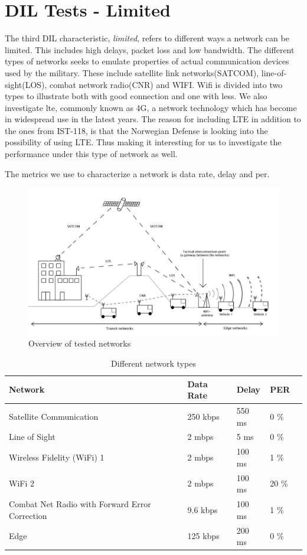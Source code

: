 \section{DIL Tests - Limited}

The third DIL characteristic, \textit{limited}, refers to different ways a network
can be limited. This includes high delays, packet loss and low bandwidth. The
different types of networks seeks to emulate properties of actual communication
devices used by the military. These include satellite link networks(SATCOM),
line-of-sight(LOS), combat network radio(CNR) and WIFI. Wifi is divided into two
types to illustrate both with good connection and one with less. We also
investigate \gls{lte}, commonly known as 4G, a network technology which has
become in widespread use in the latest years. The reason for including LTE in
addition to the ones from IST-118, is that the Norwegian Defense is looking into
the possibility of using LTE. Thus making it interesting for us to investigate
the performance under this type of network as well.

The metrics we use to characterize a network is data rate, delay and \gls{per}.

\begin{figure}[h!]
\includegraphics[scale=0.25]{images/networks_overview.pdf}
\caption{Overview of tested networks}
\label{figure-networks-overview}
\end{figure}

\begin{table}[h!]
\begin{tabular}{| l | l | l | l | l |}
\hline
  \textbf{Network} & \textbf{Data Rate} & \textbf{Delay} & \textbf{PER} \\ \hline
  Satellite Communication & 250 kbps & 550 ms & 0 \% \\ \hline
  Line of Sight & 2 mbps & 5 ms & 0 \% \\ \hline
  Wireless Fidelity (WiFi) 1 & 2 mbps & 100 ms & 1 \% \\ \hline
  WiFi 2 & 2 mbps & 100 ms & 20 \% \\ \hline
  Combat Net Radio with Forward Error Correction & 9.6 kbps & 100 ms & 1 \% \\ \hline
  Edge & 125 kbps & 200 ms & 0 \% \\ \hline
\end{tabular}
\caption{Different network types}
\label{table-network-types}
\end{table}


